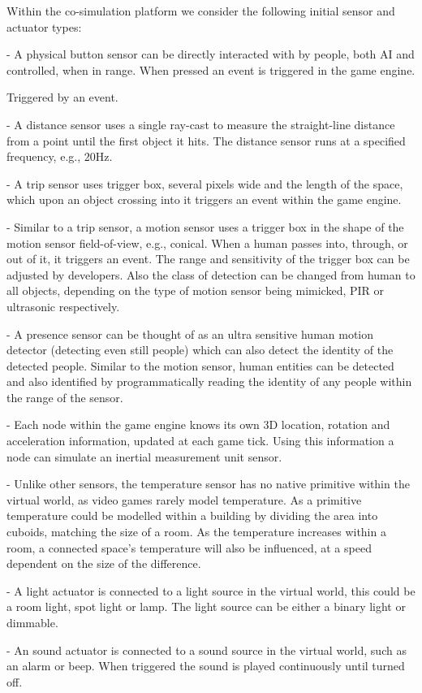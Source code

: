 Within the co-simulation platform we consider the following initial sensor and actuator types:
\begin{description}[topsep=0pt]
  \item [Button] - A physical button sensor can be directly interacted with by people, both AI and controlled, when in range. When pressed an event is triggered in the game engine.
    \begin{description}[topsep=0pt]
      \item[Type:] Triggered by an event. 
    \end{description}
  \item [Distance] - A distance sensor uses a single ray-cast to measure the straight-line distance from a point until the first object it hits. The distance sensor runs at a specified frequency, e.g., 20Hz.
  \item [Trip] - A trip sensor uses trigger box, several pixels wide and the length of the space, which upon an object crossing into it triggers an event within the game engine.
  \item [Motion] - Similar to a trip sensor, a motion sensor uses a trigger box in the shape of the motion sensor field-of-view, e.g., conical. When a human passes into, through, or out of it, it triggers an event. The range and sensitivity of the trigger box can be adjusted by developers. Also the class of detection can be changed from human to all objects, depending on the type of motion sensor being mimicked, PIR or ultrasonic respectively.
  \item [Presence] - A presence sensor can be thought of as an ultra sensitive human motion detector (detecting even still people) which can also detect the identity of the detected people. Similar to the motion sensor, human entities can be detected and also identified by programmatically reading the identity of any people within the range of the sensor. 
  \item [IMU] - Each node within the game engine knows its own 3D location, rotation and acceleration information, updated at each game tick. Using this information a node can simulate an inertial measurement unit sensor.
  \item [Temperature] - Unlike other sensors, the temperature sensor has no native primitive within the virtual world, as video games rarely model temperature. As a primitive temperature could be modelled within a building by dividing the area into cuboids, matching the size of a room. As the temperature increases within a room, a connected space's temperature will also be influenced, at a speed dependent on the size of the difference.
  \item [Light] - A light actuator is connected to a light source in the virtual world, this could be a room light, spot light or lamp. The light source can be either a binary light or dimmable.
  \item [Sound] - An sound actuator is connected to a sound source in the virtual world, such as an alarm or beep. When triggered the sound is played continuously until turned off. 
 \end{description} 


